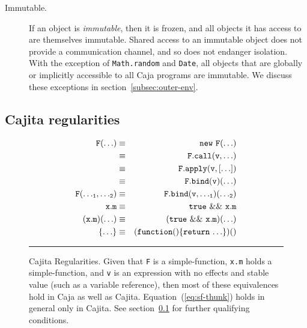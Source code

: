 \documentclass[letterpaper,twocolumn,10pt]{article}
\newcommand{\code}[1]{{\tt {#1}}}              %
\begin{document}
\begin{description}
  \item[Immutable.] If an object is \emph{immutable}, then it is frozen, and all objects it has access to are 
  themselves immutable. Shared access to an immutable object does not provide a communication channel, and so does 
  not endanger isolation. With the exception of \code{Math.random} and \code{Date}, all objects that are globally or 
  implicitly accessible to all Caja programs are immutable. We discuss these exceptions in 
  section~\ref{subsec:outer-env}.

\end{description}

\subsection{Cajita regularities}
\label{subsec:cajita-reg}

\begin{figure}
\begin{eqnarray}
  \code{F(\ldots)}                & \equiv & \code{new\ F(\ldots)}                     \label{eq:sf-new} \\
                                  & \equiv & \code{F.call(v,\ldots)}                   \label{eq:sf-call} \\
                                  & \equiv & \code{F.apply(v,[\ldots])}                \label{eq:sf-apply} \\
                                  & \equiv & \code{F.bind(v)(\ldots)}                  \label{eq:sf-bind-1} \\
  \code{F({\ldots}_1,{\ldots}_2)} & \equiv & \code{F.bind(v,{\ldots}_1)({\ldots}_2)}   \label{eq:sf-bind-n} \\
  \code{x.m}                      & \equiv & \code{true\ \&\&\ x.m}                    \label{eq:sf-true} \\
  \code{(x.m)(\ldots)}            & \equiv & \code{(true\ \&\&\ x.m)(\ldots)}          \label{eq:sf-true-call} \\
  \code{\{{\ldots}\}}             & \equiv & \code{(function()\{return\ {\ldots\}})()} \label{eq:sf-thunk}
\end{eqnarray}

\caption[Cajita Regularities.]{Cajita Regularities. Given that \code{F} is a simple-function, \code{x.m} holds a 
simple-function, and \code{v} is an expression with no effects and stable value (such as a variable reference), then 
most of these equivalences hold in Caja as well as Cajita. Equation~(\ref{eq:sf-thunk}) holds in general only in 
Cajita.  See section~\ref{subsec:cajita-reg} for further qualifying conditions. \\ } \hrule
\label{eqn:simple-func}
\end{figure}
\end{document}
